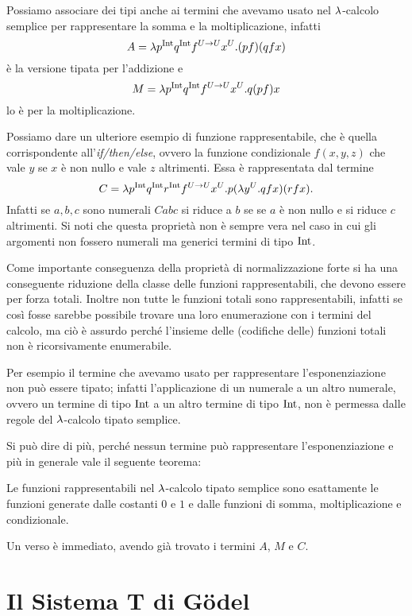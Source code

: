 \documentclass[]{marticle}
\begin{document}
Possiamo associare dei tipi anche ai termini che avevamo usato nel $\lambda$-calcolo
semplice per rappresentare la somma e la moltiplicazione, infatti 
\[
    A = \lambda p^{\text{Int}} q^{\text{Int}} f^{U\rightarrow U}x^U. (pf)(qfx)
\]
\`e la versione tipata per l'addizione e 
\[
    M = \lambda p^{\text{Int}} q^{\text{Int}} f^{U\rightarrow U}x^U. q (p f) x
\]
lo \`e per la moltiplicazione.

Possiamo dare un ulteriore esempio di funzione rappresentabile, che \`e quella
corrispondente all'\textit{if/then/else}, ovvero la funzione condizionale
$f(x,y,z)$ che vale $y$ se $x$ \`e non nullo e vale $z$ altrimenti. Essa \`e
rappresentata dal termine
\[
    C = \lambda p^{\text{Int}} q^{\text{Int}} r^{\text{Int}} f^{U\rightarrow U} x^U. p (\lambda y^U. qfx)(rfx).
\]
Infatti se $a, b, c$ sono numerali $Cabc$ si riduce a $b$ se se $a$ \`e non
nullo e si riduce $c$ altrimenti. Si noti che questa propriet\`a non \`e sempre
vera nel caso in cui gli argomenti non fossero numerali ma generici termini di
tipo $\text{Int}$.

Come importante conseguenza della propriet\`a di normalizzazione forte si ha una
conseguente riduzione della classe delle funzioni rappresentabili, che devono
essere per forza totali. Inoltre non tutte le funzioni totali sono
rappresentabili, infatti se cos\`i fosse sarebbe possibile trovare una loro
enumerazione con i termini del calcolo, ma ci\`o \`e assurdo perch\'e l'insieme
delle (codifiche delle) funzioni totali non \`e ricorsivamente enumerabile.

Per esempio il termine che avevamo usato per rappresentare l'esponenziazione non
pu\`o essere tipato; infatti l'applicazione di un numerale a un altro numerale,
ovvero un termine di tipo $\text{Int}$ a un altro termine di tipo $\text{Int}$, non \`e
permessa dalle regole del $\lambda$-calcolo tipato semplice.

Si pu\`o dire di pi\`u, perch\'e nessun termine pu\`o rappresentare
l'esponenziazione e pi\`u in generale vale il seguente teorema:

\begin{block}[Teorema]
    Le funzioni rappresentabili nel $\lambda$-calcolo tipato semplice sono
    esattamente le funzioni generate dalle costanti $0$ e $1$ e dalle funzioni
    di somma, moltiplicazione e condizionale.
\end{block}

Un verso \`e immediato, avendo gi\`a trovato i termini $A$, $M$ e $C$.

\section{Il Sistema T di G\"odel}
\end{document}
